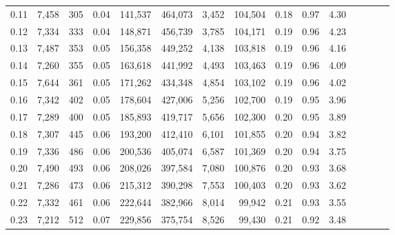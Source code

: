 \begin{tabular}{rrrcrrrrrrrrrrr}
0.11 &   7,458 &     305 &                                       0.04 &  141,537 &  464,073 &    3,452 &  104,504 &  0.18 &  0.97 &                         4.30 \\
0.12 &   7,334 &     333 &                                       0.04 &  148,871 &  456,739 &    3,785 &  104,171 &  0.19 &  0.96 &                         4.23 \\
0.13 &   7,487 &     353 &                                       0.05 &  156,358 &  449,252 &    4,138 &  103,818 &  0.19 &  0.96 &                         4.16 \\
0.14 &   7,260 &     355 &                                       0.05 &  163,618 &  441,992 &    4,493 &  103,463 &  0.19 &  0.96 &                         4.09 \\
0.15 &   7,644 &     361 &                                       0.05 &  171,262 &  434,348 &    4,854 &  103,102 &  0.19 &  0.96 &                         4.02 \\
0.16 &   7,342 &     402 &                                       0.05 &  178,604 &  427,006 &    5,256 &  102,700 &  0.19 &  0.95 &                         3.96 \\
0.17 &   7,289 &     400 &                                       0.05 &  185,893 &  419,717 &    5,656 &  102,300 &  0.20 &  0.95 &                         3.89 \\
0.18 &   7,307 &     445 &                                       0.06 &  193,200 &  412,410 &    6,101 &  101,855 &  0.20 &  0.94 &                         3.82 \\
0.19 &   7,336 &     486 &                                       0.06 &  200,536 &  405,074 &    6,587 &  101,369 &  0.20 &  0.94 &                         3.75 \\
0.20 &   7,490 &     493 &                                       0.06 &  208,026 &  397,584 &    7,080 &  100,876 &  0.20 &  0.93 &                         3.68 \\
0.21 &   7,286 &     473 &                                       0.06 &  215,312 &  390,298 &    7,553 &  100,403 &  0.20 &  0.93 &                         3.62 \\
0.22 &   7,332 &     461 &                                       0.06 &  222,644 &  382,966 &    8,014 &   99,942 &  0.21 &  0.93 &                         3.55 \\
0.23 &   7,212 &     512 &                                       0.07 &  229,856 &  375,754 &    8,526 &   99,430 &  0.21 &  0.92 &                         3.48 \\

\end{tabular}
